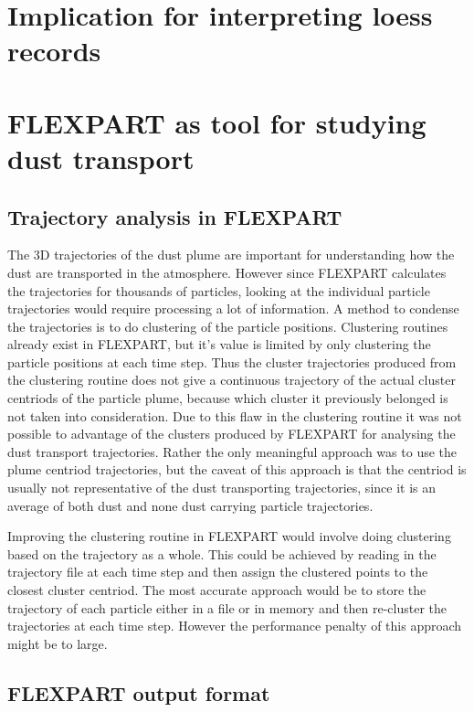 \section{Implication for interpreting loess records}


\section{FLEXPART as tool for studying dust transport} 
\subsection{Trajectory analysis in FLEXPART}
The 3D trajectories of the dust plume are important for understanding how the dust are transported in the atmosphere. However since FLEXPART calculates the trajectories for thousands of particles, looking at the individual particle trajectories would require processing a lot of information. A method to condense the trajectories is to do clustering of the particle positions. Clustering routines already exist in FLEXPART, but it's value is limited by only clustering the particle positions at each time step. Thus the cluster trajectories produced from the clustering routine does not give a continuous trajectory of the actual cluster centriods of the particle plume, because which cluster it previously belonged is not taken into consideration. Due to this flaw in the clustering routine it was not possible to advantage of the clusters produced by FLEXPART for analysing the dust transport trajectories. Rather the only meaningful approach was to use the plume centriod trajectories, but the caveat of this approach is that the centriod is usually not representative of the dust transporting trajectories, since it is an average of both dust and none dust carrying particle trajectories.

Improving the clustering routine in FLEXPART would involve doing clustering based on the trajectory as a whole. This could be achieved by reading in the trajectory file at each time step and then assign the clustered points to the closest cluster centriod. The most accurate approach would be to store the trajectory of each particle either in a file or in memory and then re-cluster the trajectories at each time step. However the performance penalty of this approach might be to large.

\subsection{FLEXPART output format}

